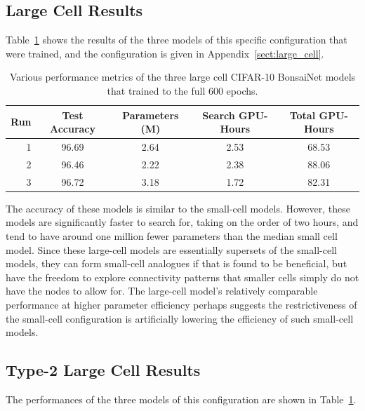 \subsection{Large Cell Results}
Table~\ref{tab:large_cell_metrics} shows the results of the three
models of this specific configuration that were trained, and the configuration is given in Appendix~\ref{sect:large_cell}.

\begin{table}[h]
\begin{center}
	\begin{tabular}{r|c|c|c|c}
	Run & Test Accuracy & Parameters (M) & Search GPU-Hours & Total GPU-Hours \\
	\hline
	1	    & 96.69 & 2.64 	& 2.53 	& 68.53\\
	2 		& 96.46 & 2.22 	& 2.38 	& 88.06\\
	3		& 96.72	& 3.18	& 1.72	& 82.31\\
	\end{tabular}
\end{center}
\caption[Various performance metrics of the three large cell CIFAR-10 BonsaiNet models]{Various performance metrics of the three large cell CIFAR-10 BonsaiNet models that trained to the full 600 epochs.}
\label{tab:large_cell_metrics}
\end{table}
The accuracy of these models is similar to the small-cell models. However,
these models are significantly faster to search for, taking on the order of two hours, and tend to have around one million
fewer parameters than the median small cell model. Since these large-cell models are essentially supersets of the small-cell
models, they can form small-cell analogues if that is found to be beneficial, but have the freedom to explore connectivity patterns that
smaller cells simply do not have the nodes to allow for. The large-cell model's relatively comparable performance at
higher parameter efficiency perhaps suggests the restrictiveness of the small-cell configuration is artificially lowering the efficiency
of such small-cell models.

\subsection{Type-2 Large Cell Results}
The performances of the three models of this configuration are shown in Table~\ref{tab:large_cell_metrics}.

